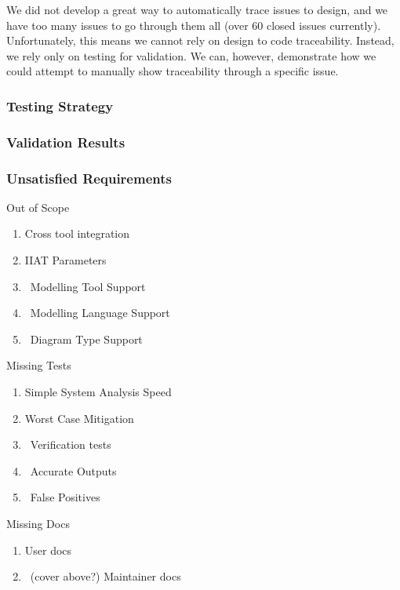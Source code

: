 \documentclass[11pt]{article}
\begin{document}
    We did not develop a great way to automatically trace issues to design,
    and we have too many issues to go through them all (over 60 closed issues currently).
    Unfortunately, this means we cannot rely on design to code traceability.
    Instead, we rely only on testing for validation.
    We can, however, demonstrate how we could attempt to manually show traceability through a specific issue.

    \newpage
    \subsubsection{Testing Strategy}\label{subsubsec:tests-strat}


    \newpage
    \subsubsection{Validation Results}\label{subsubsec:test-validation}


    \newpage
    \subsubsection{Unsatisfied Requirements} \label{subsubsec:unsat-reqs}
    Out of Scope
    \begin{enumerate}
        \item Cross tool integration
        \item IIAT Parameters
        \item ~Modelling Tool Support
        \item ~Modelling Language Support
        \item ~Diagram Type Support
    \end{enumerate}
    Missing Tests
    \begin{enumerate}
        \item Simple System Analysis Speed
        \item Worst Case Mitigation
        \item ~Verification tests
        \item ~Accurate Outputs
        \item ~False Positives
    \end{enumerate}
    Missing Docs %
    \begin{enumerate}
        \item User docs
        \item ~(cover above?) Maintainer docs
    \end{enumerate}
\end{document}
